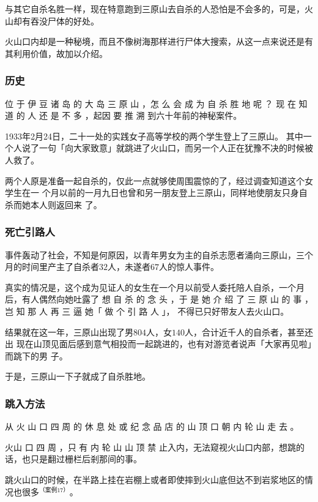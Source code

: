\documentclass[UTF8]{ctexart}
\begin{document}
与其它自杀名胜一样，现在特意跑到三原山去自杀的人恐怕是不会多的，可是，火山却有吞没尸体的好处。

火山口内却是一种秘境，而且不像树海那样进行尸体大搜索，从这一点来说还是有其利用价值，故加以介绍。

\subsubsection{历史}

位 于 伊 豆 诸 岛 的 大 岛 三 原 山 ，怎 么 会 成 为 自 杀 胜 地 呢 ？ 现 在 知 道 的 人 还 是 不 多 ，起因 要 推 溯 到六十年前的神秘案件。

1933年2月24日，二十一处的实践女子高等学校的两个学生登上了三原山。
其中一个人说了一句「向大家致意」就跳进了火山口，而另一个人正在犹豫不决的时候被人救了。

两个人原是准备一起自杀的，仅此一点就够使周围震惊的了，经过调查知道这个女学生在一
个月以前的一月九日也曾和另一朋友登上三原山，同样地使朋友只身自杀而她本人则返回来
了。

\subsubsection{死亡引路人}

事件轰动了社会，不知是何原因，以青年男女为主的自杀志愿者涌向三原山，三个月的时间里产主了自杀者$32$人，未遂者$67$人的惊人事件。

真实的情况是，这个成为见证人的女生在一个月以前受人委托陪人自杀，一个月后，有人偶然向她吐露了 想 自 杀 的 念 头 ，于 是 她 介 绍 了 三 原 山 的 事 ，岂 知 那 人 再 三 逼 她「 做 个 引 路 人 」， 不得已只好带友人去火山口。

结果就在这一年，三原山出现了男$804$人，女$140$人，合计近千人的自杀者，甚至还出 现在山顶见面后感到意气相投而一起跳进的，也有对游览者说声「大家再见啦」而跳下的男 子。

于是，三原山一下子就成了自杀胜地。

\subsubsection{跳入方法}

从 火 山 口 四 周 的 休 息 处 或 纪 念 品 店 的 山 顶 口 朝 内 轮 山 走 去 。

火山 口 四 周 ，只 有 内 轮 山 山 顶 禁 止入内，无法窥视火山口内部，想跳的话，也只是翻过栅栏后剎那间的事。 

跳火山口的时候，在半路上挂在岩棚上或者即使摔到火山底但达不到岩浆地区的情况也很多$^{（案例 17）}$。
\end{document}
